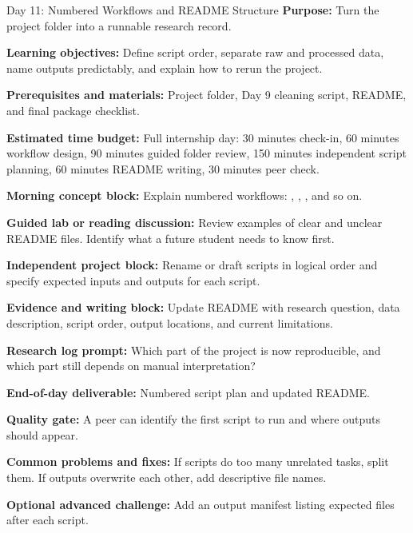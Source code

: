 \begin{dailybox}{Day 11: Numbered Workflows and README Structure}
\textbf{Purpose:} Turn the project folder into a runnable research record.

\textbf{Learning objectives:} Define script order, separate raw and processed data, name outputs predictably, and explain how to rerun the project.

\textbf{Prerequisites and materials:} Project folder, Day 9 cleaning script, README, and final package checklist.

\textbf{Estimated time budget:} Full internship day: 30 minutes check-in, 60 minutes workflow design, 90 minutes guided folder review, 150 minutes independent script planning, 60 minutes README writing, 30 minutes peer check.

\textbf{Morning concept block:} Explain numbered workflows: , , , and so on.

\textbf{Guided lab or reading discussion:} Review examples of clear and unclear README files. Identify what a future student needs to know first.

\textbf{Independent project block:} Rename or draft scripts in logical order and specify expected inputs and outputs for each script.

\textbf{Evidence and writing block:} Update README with research question, data description, script order, output locations, and current limitations.

\textbf{Research log prompt:} Which part of the project is now reproducible, and which part still depends on manual interpretation?

\textbf{End-of-day deliverable:} Numbered script plan and updated README.

\textbf{Quality gate:} A peer can identify the first script to run and where outputs should appear.

\textbf{Common problems and fixes:} If scripts do too many unrelated tasks, split them. If outputs overwrite each other, add descriptive file names.

\textbf{Optional advanced challenge:} Add an output manifest listing expected files after each script.
\end{dailybox}

